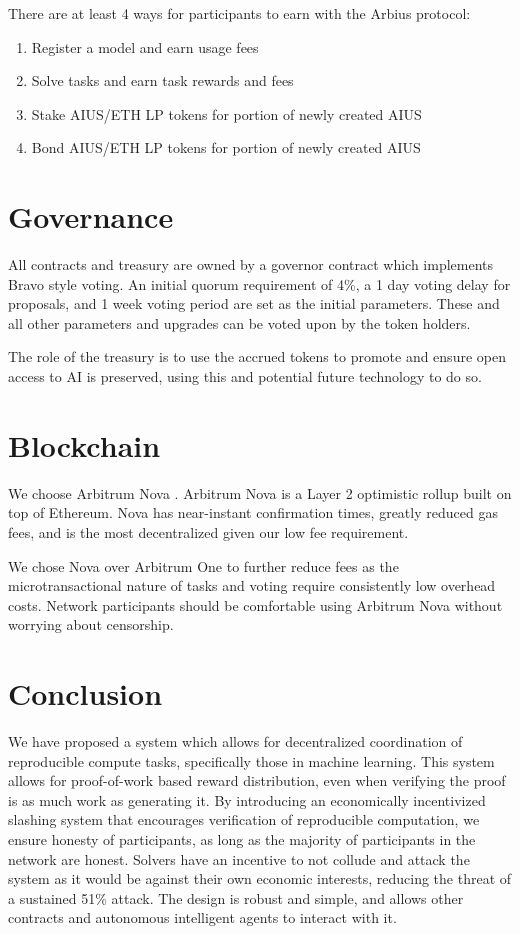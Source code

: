 \documentclass{article}
\begin{document}
There are at least 4 ways for participants to earn with the Arbius protocol:

\begin{enumerate}
    \item Register a model and earn usage fees
    \item Solve tasks and earn task rewards and fees
    \item Stake AIUS/ETH LP tokens for portion of newly created AIUS
    \item Bond AIUS/ETH LP tokens for portion of newly created AIUS
\end{enumerate}

\section{Governance}

All contracts and treasury are owned by a governor contract which implements Bravo \cite{bravo} style voting. An initial quorum requirement of 4\%, a 1 day voting delay for proposals, and 1 week voting period are set as the initial parameters. These and all other parameters and upgrades can be voted upon by the token holders.

The role of the treasury is to use the accrued tokens to promote and ensure open access to AI is preserved, using this and potential future technology to do so.


\section{Blockchain}

We choose Arbitrum Nova \cite{arbitrumnitro}. Arbitrum Nova is a Layer 2 optimistic rollup built on top of Ethereum. Nova has near-instant confirmation times, greatly reduced gas fees, and is the most decentralized given our low fee requirement.

We chose Nova over Arbitrum One to further reduce fees as the microtransactional nature of tasks and voting require consistently low overhead costs. Network participants should be comfortable using Arbitrum Nova without worrying about censorship.

\section{Conclusion}

We have proposed a system which allows for decentralized coordination of reproducible compute tasks, specifically those in machine learning. This system allows for proof-of-work based reward distribution, even when verifying the proof is as much work as generating it. By introducing an economically incentivized slashing system that encourages verification of reproducible computation, we ensure honesty of participants, as long as the majority of participants in the network are honest. Solvers have an incentive to not collude and attack the system as it would be against their own economic interests, reducing the threat of a sustained 51\% attack. The design is robust and simple, and allows other contracts and autonomous intelligent agents to interact with it.
\end{document}
